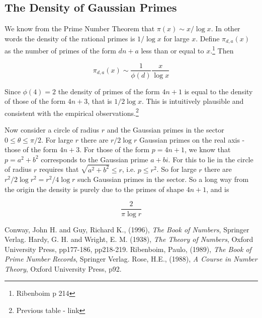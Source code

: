 \documentclass[a4paper]{article}
\begin{document}
\subsection{The Density of Gaussian Primes}

We know from the Prime Number Theorem that $\pi(x) \sim x/\log x$. In other words the density of the
rational primes is $1/\log x$ for large $x$. Define $\pi_{d,a}(x)$ as the number of primes of the form
$dn + a$ less than or equal to $x$.\footnote{Ribenboim p 214} Then

\begin{displaymath}
\pi_{d,a}(x) \sim \frac{1}{\phi (d)}\frac{x}{\log x}
\end{displaymath}

Since $\phi (4)=2$ the density of primes of the form $4n + 1$ is equal to the density of those
of the form $4n + 3$, that is $1/2\log x$. This is intuitively plausible and consistent with the
empirical observations.\footnote{Previous table - link}

Now consider a circle of radius $r$ and the Gaussian primes in the sector $0 \leq \theta \leq \pi/2$.
For large $r$ there are $r/2\log r$ Gaussian primes on the real axis - those of the form $4n + 3$.
For those of the form $p = 4n + 1$, we know that $p = a^2 + b^2$ corresponds to the Gaussian
prime $a + bi$. For this to lie in the circle of radius $r$ requires that $\sqrt{a^2 + b^2} \leq r$, i.e.
$p \leq r^2$. So for large $r$ there are $r^2/2\log r^2 = r^2/4\log r$ such Gaussian primes in
the sector. So a long way from the origin the density is purely due to the primes of shape $4n + 1$,
and is

\begin{displaymath}
\frac{2}{\pi \log r}
\end{displaymath}



\begin{thebibliography}{9}
Conway, John H. and Guy, Richard K., (1996),
\emph{The Book of Numbers}, Springer Verlag. 
Hardy, G. H. and Wright, E. M. (1938),
\emph{The Theory of Numbers}, Oxford University Press, pp177-186, pp218-219.  
Ribenboim, Paulo, (1989),
\emph{The Book of Prime Number Records}, Springer Verlag. 
Rose, H.E., (1988),
\emph{A Course in Number Theory}, Oxford University Press, p92.
\end{thebibliography}
\end{document}
